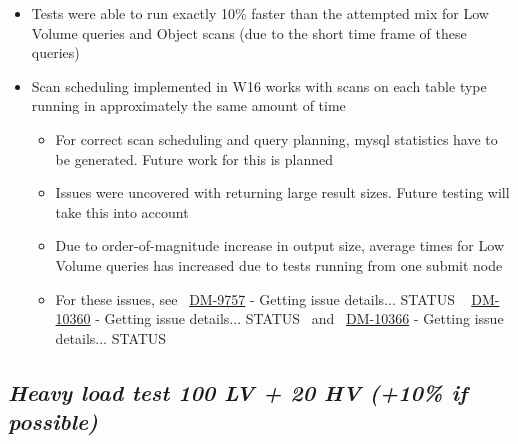 \documentclass[DM,toc]{lsstdoc}
\begin{document}
\begin{itemize}
  \begin{itemize}
  \item
    Tests were able to run exactly 10\% faster than the attempted mix
    for Low Volume queries and Object scans (due to the short time frame
    of these queries)
  \item
    Scan scheduling implemented in W16 works with scans on each table
    type running in approximately the same amount of time

    \begin{itemize}
    \item
      For correct scan scheduling and query planning, mysql statistics
      have to be generated. Future work for this is planned
    \item
      Issues were uncovered with returning large result sizes. Future
      testing will take this into account
    \item
      Due to order-of-magnitude increase in output size, average times
      for Low Volume queries has increased due to tests running from one
      submit node
    \item
      For these issues, see~
      \href{https://jira.lsstcorp.org/browse/DM-9757}{DM-9757} - Getting
      issue details... STATUS ~
      \href{https://jira.lsstcorp.org/browse/DM-10360}{DM-10360} -
      Getting issue details... STATUS ~and~
      \href{https://jira.lsstcorp.org/browse/DM-10366}{DM-10366} -
      Getting issue details... STATUS
    \end{itemize}
  \end{itemize}
\end{itemize}

\subsection{\texorpdfstring{\textbf{\emph{Heavy load test 100 LV + 20
HV (+10\% if
possible)}}}{Heavy load test 100 LV + 20 HV (+10\% if possible)}}\label{heavy-load-test-100-lv-20-hv-10-if-possible}
\end{document}
